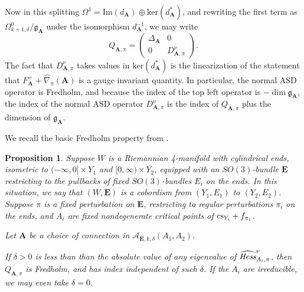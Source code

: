\documentclass[10pt,a4paper]{amsart}
\newtheorem{proposition}[theorem]{Proposition}
\theoremstyle{definition}
\theoremstyle{remark}
\numberwithin{figure}{qchap}
\begin{document}
Now in this splitting $\Omega^1 = \text{Im}(d_{\mathbf{A}}) \oplus \text{ker}(d_{\mathbf{A}}^*)$, and rewriting the first term as $\Omega^0_{k+1,\delta}/\mathfrak g_{\mathbf{A}}$ under the isomorphism $d_{\mathbf{A}}^{-1}$, we may write 
$$Q_{\mathbf{A},\pi} = \begin{pmatrix}\Delta_{\mathbf{A}} & 0 \\ 0 & D^\nu_{\mathbf{A},\pi}\end{pmatrix}.$$ 
The fact that $D^\nu_{\mathbf{A},\pi}$ takes values in $\text{ker}(d_{\mathbf{A}}^*)$ is the linearization of the statement that $F_{\mathbf{A}}^+ + \widehat{\nabla}_\pi(\mathbf{A})$ is a gauge invariant quantity. In particular, the normal ASD operator is Fredholm, and because the index of the top left operator is $- \dim \mathfrak g_{\mathbf{A}}$, the index of the normal ASD operator $D^\nu_{\mathbf{A},\pi}$ is the index of $Q_{\mathbf{A},\pi}$ plus the dimension of $\mathfrak g_{\mathbf{A}}$.

We recall the basic Fredholm property from \cite[Sections~3.2~and~3.3.1]{Don}.

\begin{proposition}\label{Fred1}Suppose $W$ is a Riemannian 4-manifold with cylindrical ends, isometric to $(-\infty, 0] \times Y_1$ and $[0,\infty) \times \overline{Y_2}$, equipped with an $SO(3)$-bundle $\mathbf{E}$ restricting to the pullbacks of fixed $SO(3)$-bundles $E_i$ on the ends. In this situation, we say that $(W,\mathbf{E})$ is a cobordism from $(Y_1, E_1)$ to $(Y_2, E_2)$. Suppose $\pi$ is a fixed perturbation on $\mathbf{E}$, restricting to regular perturbations $\pi_i$ on the ends, and $A_i$ are fixed nondegenerate critical points of $\textup{cs}_{Y_i} + f_{\pi_i}$. 

Let $\mathbf{A}$ be a choice of connection in $\mathcal A_{\mathbf{E},k,\delta}(A_1,A_2)$. 

If $\delta > 0$ is less than than the absolute value of any eigenvalue of $\widehat{\text{\em{Hess}}}^\nu_{A_i, \pi}$, then $Q_{\mathbf{A},\pi}$ is Fredholm, and has index independent of such $\delta$. If the $A_i$ are irreducible, we may even take $\delta = 0$.
\end{proposition}
\end{document}
